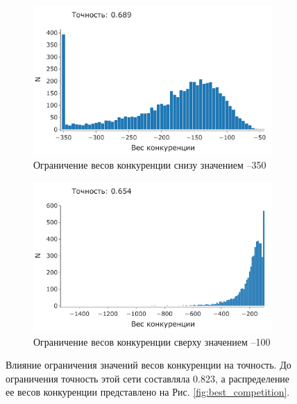 \documentclass[a4paper]{article}
\begin{document}
\begin{figure}[H] 
\centering

\begin{subfigure}{0.45\textwidth}
    \includegraphics[width=\textwidth,keepaspectratio=true]{competition_distribution_clamp_low_ru.pdf}
    \caption{Ограничение весов конкуренции снизу значением --350} 
\end{subfigure}
\begin{subfigure}{0.45\textwidth}
    \includegraphics[width=\textwidth,keepaspectratio=true]{competition_distribution_clamp_high_ru.pdf}
    \caption{Ограничение весов конкуренции сверху значением --100}
\end{subfigure} 
\caption{Влияние ограничения значений весов конкуренции на точность. До ограничения точность этой сети составляла 0.823, а распределение ее весов конкуренции представлено на Рис. \ref{fig:best_competition}.}
\end{figure}
\end{document}
